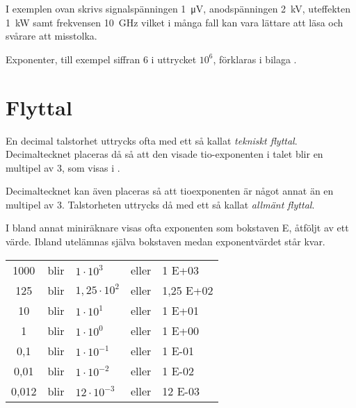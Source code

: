 
I exemplen ovan skrivs signalspänningen \qty{1}{\micro\volt},
anodspänningen \qty{2}{\kilo\volt}, uteffekten \qty{1}{\kilo\watt} samt
frekvensen \qty{10}{\giga\hertz} vilket i många fall kan vara lättare
att läsa och svårare att misstolka.


Exponenter, till exempel siffran 6 i uttrycket \(10^6\), förklaras i
bilaga .


\section{Flyttal}

En decimal talstorhet uttrycks ofta med ett så kallat \emph{tekniskt
flyttal}.  Decimaltecknet placeras då så att den visade tio-exponenten
i talet blir en multipel av 3, som visas i .

Decimaltecknet kan även placeras så att tioexponenten är något annat
än en multipel av 3.  Talstorheten uttrycks då med ett så kallat
\emph{allmänt flyttal}.

I bland annat miniräknare visas ofta exponenten som bokstaven E,
åtföljt av ett värde.  Ibland utelämnas själva bokstaven medan
exponentvärdet står kvar.

\bigskip

\noindent\begin{tabular}{Sllll}
1000  & blir & \(1    \cdot 10^3  \) & eller & 1 E+03 \\
125   & blir & \(1,25 \cdot 10^2  \) & eller & 1,25 E+02 \\
10    & blir & \(1    \cdot 10^1  \) & eller & 1 E+01 \\
1     & blir & \(1    \cdot 10^0  \) & eller & 1 E+00 \\
0,1   & blir & \(1    \cdot 10^{-1}\) & eller & 1 E-01 \\
0,01  & blir & \(1    \cdot 10^{-2}\) & eller & 1 E-02 \\
0,012 & blir & \(12   \cdot 10^{-3}\) & eller & 12 E-03 \\
\end{tabular}

